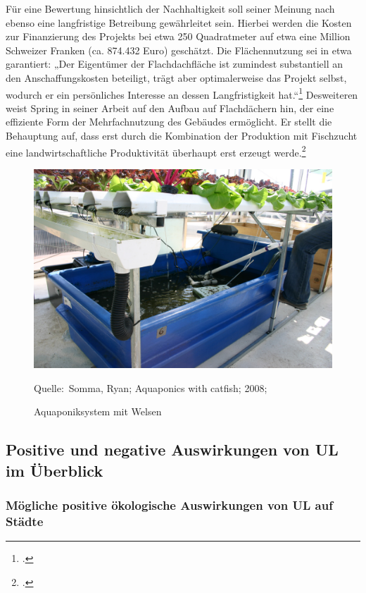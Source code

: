 \documentclass{scrartcl}
\newcommand*{\Bildquelle}[1]{\par\raggedleft\footnotesize Quelle:~#1}
\begin{document}
Für eine Bewertung hinsichtlich der Nachhaltigkeit soll seiner Meinung nach ebenso eine langfristige Betreibung gewährleitet sein. Hierbei werden die Kosten zur Finanzierung des Projekts bei etwa 250 Quadratmeter auf etwa eine Million Schweizer Franken (ca. 874.432 Euro) geschätzt. Die Flächennutzung sei in etwa garantiert: „Der Eigentümer der Flachdachfläche ist zumindest substantiell an den Anschaffungskosten beteiligt, trägt aber optimalerweise das Projekt selbst, wodurch er ein persönliches Interesse an dessen Langfristigkeit hat.“\footcite[Vgl.][S.37]{TobiasSpringDerBasel-Stadt} Desweiteren weist Spring in seiner Arbeit auf den Aufbau auf Flachdächern hin, der eine effiziente Form der Mehrfachnutzung des Gebäudes ermöglicht. Er stellt die Behauptung auf, dass erst durch die Kombination der Produktion mit Fischzucht eine landwirtschaftliche Produktivität überhaupt erst erzeugt werde.\footcite[S.47]{TobiasSpringDerBasel-Stadt} 

\begin{figure}[htbp]
\centering
\caption{Aquaponiksystem mit Welsen}
\includegraphics[width=12cm]{image_folder/Aquaponics_with_catfish.jpg}
\Bildquelle{Somma, Ryan; Aquaponics with catfish; 2008;}
\label{fig:aquaponik}
\end{figure}

\subsection{Positive und negative Auswirkungen von UL im Überblick}
     \subsubsection{Mögliche positive ökologische Auswirkungen von UL auf Städte}  
\end{document}

